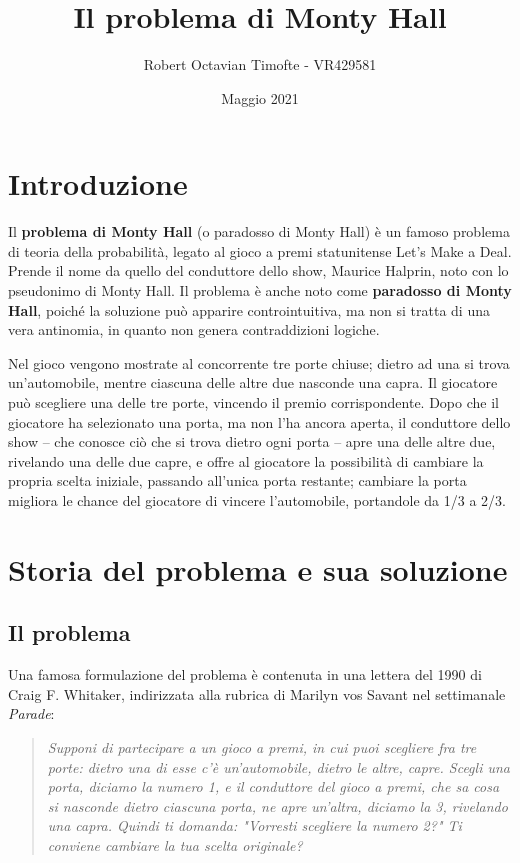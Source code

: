 \documentclass[a4paper, 12pt]{report}
\title{Il problema di Monty Hall}
\author{Robert Octavian Timofte - VR429581}
\date{Maggio 2021}
\begin{document}
\maketitle
\tableofcontents

\chapter*{Introduzione}
Il \textbf{problema di Monty Hall} (o paradosso di Monty Hall) è un famoso problema di teoria della probabilità, legato al gioco a premi statunitense Let's Make a Deal. Prende il nome da quello del conduttore dello show, Maurice Halprin, noto con lo pseudonimo di Monty Hall. Il problema è anche noto come \textbf{paradosso di Monty Hall}, poiché la soluzione può apparire controintuitiva, ma non si tratta di una vera antinomia, in quanto non genera contraddizioni logiche.

Nel gioco vengono mostrate al concorrente tre porte chiuse; dietro ad una si trova un'automobile, mentre ciascuna delle altre due nasconde una capra. Il giocatore può scegliere una delle tre porte, vincendo il premio corrispondente. Dopo che il giocatore ha selezionato una porta, ma non l'ha ancora aperta, il conduttore dello show – che conosce ciò che si trova dietro ogni porta – apre una delle altre due, rivelando una delle due capre, e offre al giocatore la possibilità di cambiare la propria scelta iniziale, passando all'unica porta restante; cambiare la porta migliora le chance del giocatore di vincere l'automobile, portandole da 1/3 a 2/3.

\chapter{Storia del problema e sua soluzione}
\section{Il problema}
Una famosa formulazione del problema è contenuta in una lettera del 1990 di Craig F. Whitaker, indirizzata alla rubrica di Marilyn vos Savant nel settimanale \textit{Parade}:

\begin{quote}
	\textit{Supponi di partecipare a un gioco a premi, in cui puoi scegliere fra tre porte: dietro una di esse c'è un'automobile, dietro le altre, capre. Scegli una porta, diciamo la numero 1, e il conduttore del gioco a premi, che sa cosa si nasconde dietro ciascuna porta, ne apre un'altra, diciamo la 3, rivelando una capra. Quindi ti domanda: "Vorresti scegliere la numero 2?" Ti conviene cambiare la tua scelta originale?}
\end{quote}
\end{document}

